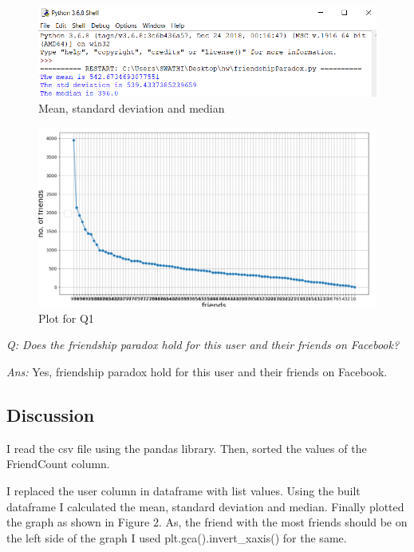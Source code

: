 \documentclass[12pt]{article}
\begin{document}
\begin{figure}[h]
    \centering
    \includegraphics[trim=0 0 0 8, clip, width=\textwidth] {Capture1.PNG}
    \caption{Mean, standard deviation and median}
    \label{fig:web-growth}
\end{figure}

\begin{figure}[h]
    \centering
    \includegraphics[trim=0 0 0 8, clip, width=\textwidth] {Capture.PNG}
    \caption{Plot for Q1}
    \label{fig:web-growth}
\end{figure}

\emph{Q: Does the friendship paradox hold for this user and their friends on Facebook?}

\emph{Ans:} Yes, friendship paradox hold for this user and their friends on Facebook.

\subsection*{Discussion}

I read the csv file using the pandas library. Then, sorted the values of the FriendCount column. 

I replaced the user column in dataframe with list values. Using the built dataframe I calculated the mean, standard deviation and median. Finally plotted the graph as shown in Figure 2. As, the friend with the most friends should be on the left side of the graph I used plt.gca().invert\_xaxis() for the same.
\end{document}
